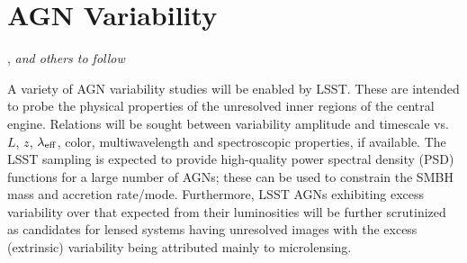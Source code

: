 %
%
%
%
%
%
%

\section{AGN Variability}
\def\secname{\chpname:variability}\label{sec:\secname}

,
{\it and others to follow}



A variety of AGN variability studies will be
enabled by LSST. These are intended to probe the physical properties
of the unresolved inner regions of the central engine. Relations will
be sought between variability amplitude and timescale vs. $L$, $z$,
$\lambda_{\rm eff}$, color, multiwavelength and spectroscopic
properties, if available. The LSST sampling is expected to provide
high-quality power spectral density (PSD) functions for a large number
of AGNs; these can be used to constrain the SMBH mass and accretion
rate/mode. Furthermore, LSST AGNs exhibiting excess variability over
that expected from their luminosities will be further scrutinized as
candidates for lensed systems having unresolved images with the excess
(extrinsic) variability being attributed mainly to microlensing.

